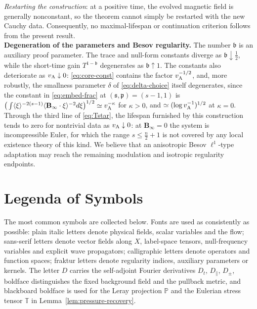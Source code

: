 \documentclass[11pt,reqno]{amsart}
\theoremstyle{plain}
\theoremstyle{definition}
\theoremstyle{remark}
\numberwithin{equation}{section}
\newcommand{\breg}{\mathfrak b}
\newcommand{\sreg}{\mathfrak s}
\newcommand{\preg}{\mathfrak p}
\newcommand{\Binf}{\mathbf B_\infty}
\begin{document}
\emph{Restarting the construction}: at a positive time, the evolved magnetic
field is generally nonconstant, so the theorem cannot simply be restarted with
the new Cauchy data. Consequently, no maximal-lifespan or continuation
criterion follows from the present result.\\

\textbf{Degeneration of the parameters and Besov regularity.} The number $\breg$ is an auxiliary proof parameter.
The trace and null-form constants diverge as $\breg\downarrow\frac12$, while the short-time gain
$T^{1-\breg}$ degenerates as $\breg\uparrow1$.  The constants also deteriorate as
$v_{\rm A}\downarrow0$: \eqref{eq:core-const} contains the factor
$v_{\rm A}^{-1/2}$, and, more robustly, the smallness parameter $\delta$ of
\eqref{eq:delta-choice} itself degenerates, since the constant in
\eqref{eq:embed-frac} at $(\sreg,\preg)=(s-1,1)$ is
$\big(\int\langle\xi\rangle^{-2(s-1)}\langle\Binf\cdot\xi\rangle^{-2}d\xi\big)^{1/2}
\simeq v_{\rm A}^{-\kappa}$ for $\kappa>0$, and
$\simeq(\log v_{\rm A}^{-1})^{1/2}$ at
$\kappa=0$. Through the third line of \eqref{eq:Tstar}, the lifespan furnished
by this construction tends to zero for nontrivial data as
$v_{\rm A}\downarrow0$: at $\Binf=0$ the system is
incompressible Euler, for which the range $s\le\frac n2+1$ is not covered by any
local existence theory of this kind.
We believe that an anisotropic Besov $\ell^1$-type adaptation may reach the
remaining modulation and isotropic regularity endpoints.



\section{Legenda of Symbols}\label{ssec:table}

The most common symbols are collected below. Fonts are used as consistently as possible: plain italic
letters denote physical fields, scalar variables and the flow; sans-serif letters denote
vector fields along $X$, label-space tensors, null-frequency variables and explicit wave propagators; calligraphic letters
denote operators and function spaces; fraktur letters denote regularity indices, auxiliary
parameters or kernels.
The letter $D$ carries the self-adjoint Fourier derivatives $D_t$, $D_{\parallel}$, $D_{\pm}$, boldface distinguishes the fixed
background field and the pullback metric, and blackboard boldface is used for the Leray
projection $\mathbb P$ and the Eulerian stress tensor $\mathbb T$ in Lemma~\ref{lem:pressure-recovery}.
\end{document}
